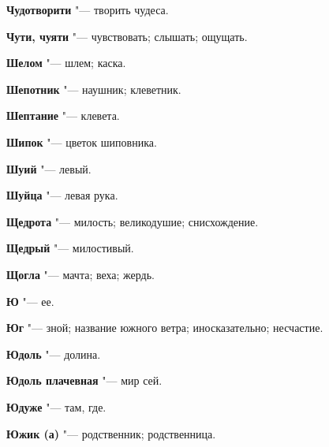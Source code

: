 \begin{mymulticols}{2}
\noindent\textbf{Чудотворити} "--- творить чудеса. 




\noindent\textbf{Чути, чуяти} "--- чувствовать; слышать; ощущать. 









\noindent\textbf{Шелом} "--- шлем; каска. 




\noindent\textbf{Шепотник} "--- наушник; клеветник. 




\noindent\textbf{Шептание} "--- клевета. 




\noindent\textbf{Шипок} "--- цветок шиповника. 




\noindent\textbf{Шуий} "--- левый. 




\noindent\textbf{Шуйца} "--- левая рука. 









\noindent\textbf{Щедрота} "--- милость; великодушие; снисхождение. 




\noindent\textbf{Щедрый} "--- милостивый. 




\noindent\textbf{Щогла} "--- мачта; веха; жердь. 









\noindent\textbf{Ю} "--- ее. 




\noindent\textbf{Юг} "--- зной; название южного ветра; иносказательно; несчастие. 




\noindent\textbf{Юдоль} "--- долина. 




\noindent\textbf{Юдоль плачевная} "--- мир сей. 




\noindent\textbf{Юдуже} "--- там, где. 




\noindent\textbf{Южик (а)} "--- родственник; родственница. 





\end{mymulticols}
